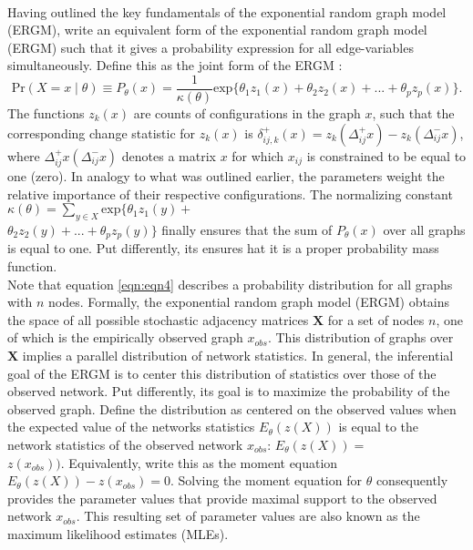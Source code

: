 \documentclass[a4paper, man]{apa6}
\begin{document}
\\
Having outlined the key fundamentals of the exponential random graph model (ERGM), write an equivalent form of the exponential random graph model (ERGM) such that it gives a probability expression for all edge-variables simultaneously. Define this as the joint form of the ERGM : \begin{equation} \label{eqn:eqn4} \text{Pr}(X = x \mid \theta) \equiv P_{\theta}(x) = \frac{1}{\kappa(\theta)}\text{exp}\{\theta_{1}z_{1}(x) + \theta_{2}z_{2}(x) + ... + \theta_{p}z_{p}(x)\}. \end{equation} The functions $z_{k}(x)$ are counts of configurations in the graph $x$, such that the corresponding change statistic for $z_{k}(x)$ is $\delta_{ij, k}^{+}(x) = z_{k}(\Delta_{ij}^{+}x) − z_{k}(\Delta_{ij}^{-}x)$, where $\Delta_{ij}^{+}x(\Delta_{ij}^{-}x)$ denotes a matrix $x$ for which $x_{ij}$ is constrained to be equal to one (zero). In analogy to what was outlined earlier, the parameters weight the relative importance of their respective configurations. The normalizing constant $\kappa(\theta) = \sum_{y \in X} \text{exp}\{\theta_{1}z_{1}(y) +$ \\ \noindent $\theta_{2}z_{2}(y)+ ... + \theta_{p}z_{p}(y)\}$ finally ensures that the sum of $P_{\theta}(x)$ over all graphs is equal to one. Put differently, its ensures hat it is a proper probability mass function. 
\\
Note that equation \eqref{eqn:eqn4} describes a probability distribution for all graphs with $n$ nodes. Formally, the exponential random graph model (ERGM) obtains the space of all possible stochastic adjacency matrices $\textbf{X}$ for a set of nodes $n$, one of which is the empirically observed graph $x_{obs}$. This distribution of graphs over $\textbf{X}$ implies a parallel distribution of network statistics. In general, the inferential goal of the ERGM is to center this distribution of statistics over those of the observed network. Put differently, its goal is to maximize the probability of the observed graph. Define the distribution as centered on the observed values when the expected value of the networks statistics $E_{\theta}(z(X))$ is equal to the network statistics of the observed network $x_{obs}$: $E_{\theta}(z(X)) =$ \\ \noindent $z(x_{obs}))$. Equivalently, write this as the moment equation $E_{\theta}(z(X)) − z(x_{obs}) = 0$. Solving the moment equation for $\theta$ consequently provides the parameter values that provide maximal support to the observed network $x_{obs}$. \clearpage \noindent This resulting set of parameter values are also known as the maximum likelihood estimates (MLEs). 
\end{document}
